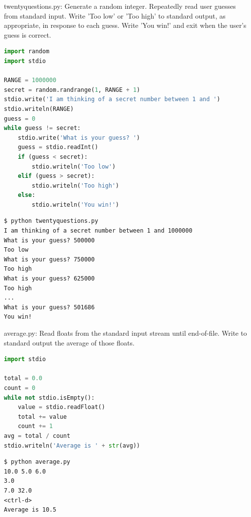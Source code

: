 \documentclass[8pt,a4paper,compress]{beamer}
\begin{document}
\begin{frame}[fragile]
\pause

\begin{framed}
\tiny twentyquestions.py: Generate a random integer. Repeatedly read user guesses from standard input. Write 'Too low' or 'Too high' to standard output, as appropriate, in response to each guess. Write 'You win!' and exit when the user's guess is correct.
\end{framed}

\begin{lstlisting}[language=Python]
import random
import stdio

RANGE = 1000000
secret = random.randrange(1, RANGE + 1)
stdio.write('I am thinking of a secret number between 1 and ')
stdio.writeln(RANGE)
guess = 0
while guess != secret:
    stdio.write('What is your guess? ')
    guess = stdio.readInt()
    if (guess < secret):
        stdio.writeln('Too low')
    elif (guess > secret):
        stdio.writeln('Too high')
    else:
        stdio.writeln('You win!')
\end{lstlisting}

\pause

\begin{lstlisting}[language={}]
$ python twentyquestions.py
I am thinking of a secret number between 1 and 1000000
What is your guess? 500000
Too low
What is your guess? 750000     
Too high
What is your guess? 625000
Too high
...
What is your guess? 501686
You win!
\end{lstlisting}
\end{frame}

\begin{frame}[fragile]
\pause

\begin{framed}
\tiny average.py: Read floats from the standard input stream until end-of-file. Write to standard output the average of those floats.
\end{framed}

\begin{lstlisting}[language=Python]
import stdio

total = 0.0
count = 0
while not stdio.isEmpty():
    value = stdio.readFloat()
    total += value
    count += 1
avg = total / count
stdio.writeln('Average is ' + str(avg))
\end{lstlisting}

\pause

\begin{lstlisting}[language={}]
$ python average.py
10.0 5.0 6.0
3.0
7.0 32.0
<ctrl-d>
Average is 10.5
\end{lstlisting}
\end{frame}
\end{document}
